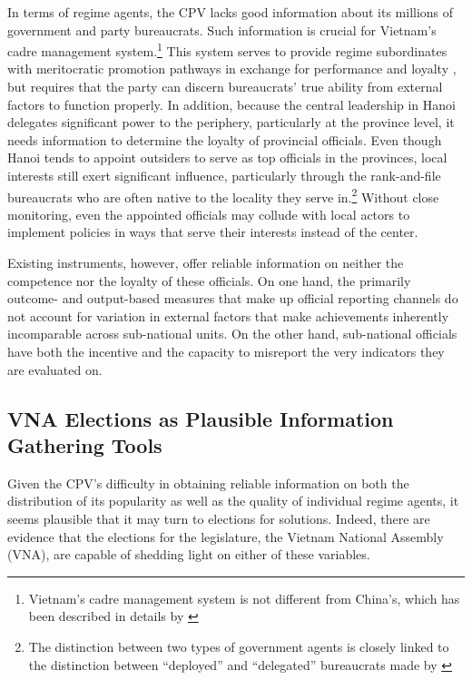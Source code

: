 \documentclass[12pt]{article}
\newcommand{\1}{\mathbbm{1}}
\begin{document}
In terms of regime agents, the CPV lacks good information about its millions of government and party bureaucrats. Such information is crucial for Vietnam's cadre management system.\footnote{Vietnam's cadre management system is not different from China's, which has been described in details by \citet{Manion1985}} This system serves to provide regime subordinates with meritocratic promotion pathways in exchange for performance and loyalty \citep{Svolik2012}, but requires that the party can discern bureaucrats' true ability from external factors to function properly. In addition, because the central leadership in Hanoi delegates significant power to the periphery, particularly at the province level, it needs information to determine the loyalty of provincial officials. Even though Hanoi tends to appoint outsiders to serve as top officials in the provinces, local interests still exert significant influence, particularly through the rank-and-file bureaucrats who are often native to the locality they serve in.\footnote{The distinction between two types of government agents is closely linked to the distinction between ``deployed'' and ``delegated'' bureaucrats made by \citet{Soifer2015}} Without close monitoring, even the appointed officials may collude with local actors to implement policies in ways that serve their interests instead of the center. 

Existing instruments, however, offer reliable information on neither the competence nor the loyalty of these officials. On one hand, the primarily outcome- and output-based measures that make up official reporting channels do not account for variation in external factors that make achievements inherently incomparable across sub-national units. On the other hand, sub-national officials have both the incentive and the capacity to misreport the very indicators they are evaluated on.

\subsection{VNA Elections as Plausible Information Gathering Tools}

Given the CPV's difficulty in obtaining reliable information on both the distribution of its popularity as well as the quality of individual regime agents, it seems plausible that it may turn to elections for solutions. Indeed, there are evidence that the elections for the legislature, the Vietnam National Assembly (VNA), are capable of shedding light on either of these variables.
\end{document}
